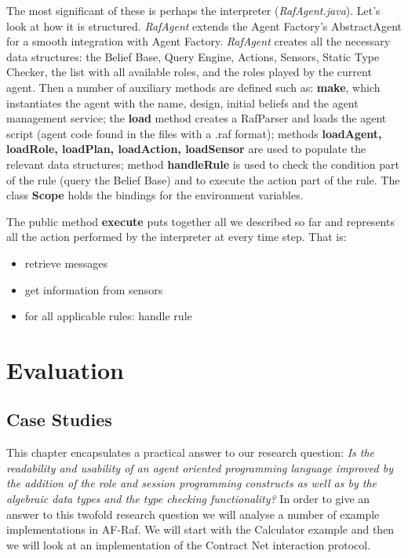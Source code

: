 \documentclass[a4paper,12pt,oneside,fleqn]{book} %
\newcommand{\todo}[1]{[\textcolor{red}{TODO}: #1]}
\begin{document}
The most significant of these is perhaps the interpreter
(\textit{RafAgent.java}). Let's look at how it is structured.
\textit{RafAgent} extends the Agent Factory's AbstractAgent for a smooth
integration with Agent Factory. \textit{RafAgent} creates all the necessary
data structures: the Belief Base, Query Engine, Actions, Sensors, Static
Type Checker, the list with all available roles, and the roles played by the
current agent. Then a number of auxiliary methods are defined such as:
\textbf{make}, which instantiates the agent with the
name, design, initial beliefs and the agent management service; the
\textbf{load} method creates a RafParser and loads the agent script (agent
code found in the files with a .raf format); methods \textbf{loadAgent,
loadRole, loadPlan, loadAction, loadSensor} are used to populate the
relevant data structures; method \textbf{handleRule} is used to check the
condition part of the rule (query the Belief Base) and to execute the
action part of the rule. The class \textbf{Scope} holds the bindings for
the environment variables. 

The public method \textbf{execute} puts together all we
described so far and represents all the action performed by the interpreter
at every time step. That is:

\begin{itemize}
    \item retrieve messages
    \item get information from sensors
    \item for all applicable rules: handle rule
\end{itemize}


\part{Evaluation}\label{part:eval} %

\chapter{Case Studies}\label{ch:casestudy} %


This chapter encapsulates a practical answer to our research question:
\textit{Is the readability and usability of an agent oriented programming
  language improved by the addition of the role and session programming
  constructs as well as by the algebraic data types and the type checking
functionality?} In order to give an answer to this twofold research
question we will analyse a number of example implementations in AF-Raf. We
will start with the Calculator example and then we will look at an
implementation of the Contract Net interaction protocol.
\end{document}
